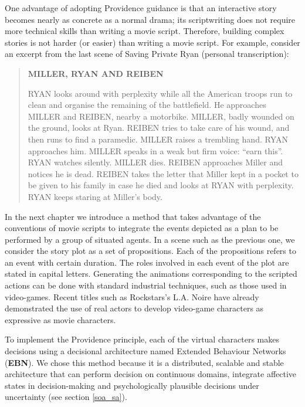 \documentclass[
		twoside,openright,titlepage,numbers=noenddot,manychapters,
		headinclude,%
                footinclude=false,cleardoublepage=empty,
                BCOR=5mm,
		fontsize=11pt, %
                 enabledeprecatedfontcommands]{scrreprt}
\begin{document}
One advantage of adopting Providence guidance is that an interactive story becomes nearly as concrete as a normal drama; its scriptwriting does not require more technical skills than writing a movie script. Therefore, building complex stories is not harder (or easier) than writing a movie script. For example, consider an excerpt from the last scene of Saving Private Ryan (personal transcription):
\begin{quote}
\begin{small}{\bf
MILLER, RYAN AND REIBEN 

RYAN looks around with perplexity while all the American troops run to clean and organise the remaining of the battlefield. He approaches MILLER and REIBEN, nearby a motorbike. MILLER, badly wounded on the ground, looks at Ryan. REIBEN tries to take care of his wound, and then runs to find a paramedic. MILLER raises a trembling hand. RYAN approaches him. MILLER speaks in a weak but firm voice: “earn this”. RYAN watches silently. MILLER dies. REIBEN approaches Miller and notices he is dead. REIBEN takes the letter that Miller kept in a pocket to be given to his family in case he died and looks at RYAN with perplexity. RYAN keeps staring at Miller’s body.
}
\end{small}\end{quote}

In the next chapter we introduce a  method that takes advantage of the conventions of movie scripts to integrate the events depicted as a plan to be performed by a group of situated agents. In a scene such as the previous one, we consider the story plot as a set of propositions. Each of the propositions refers to an event with certain duration. The roles involved in each event of the plot are stated in capital letters. Generating the animations corresponding to the scripted actions can be done with standard industrial techniques, such as those used in video-games. Recent titles such as Rockstars's L.A. Noire have already demonstrated the use of real actors to develop video-game characters as expressive as movie characters. 

To implement the Providence principle, each of the virtual characters makes decisions using a decisional architecture named Extended Behaviour Networks (\textbf{EBN}). We chose this method because it is a distributed, scalable and stable architecture that can perform decision on continuous domains, integrate affective states in decision-making and psychologically plausible decisions under uncertainty (see section \ref{soa_sa}). 
\end{document}
